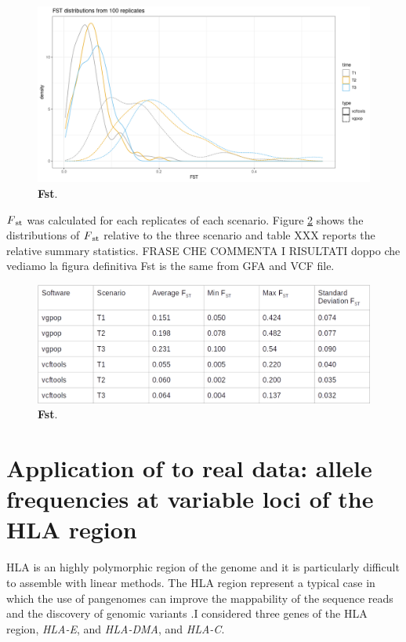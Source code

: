 \begin{figure}[H]
\centering
\includegraphics[width=1.00\textwidth]{fig/Fstvcftoolsandvgpop.png}
\decoRule
\caption{\textbf{Fst}.}
\label{fig:fsttime.png}
\end{figure}


$F\textsubscript{st}$ was calculated for each replicates of each scenario. Figure \ref{fig:fsttime.png} shows the distributions of $F\textsubscript{st}$ relative to the three scenario and table XXX reports the relative summary statistics. FRASE CHE COMMENTA I RISULTATI doppo che vediamo la figura definitiva    Fst is the same from GFA and VCF file.\\
 
\begin{figure}[H]
\centering
\includegraphics[width=1.00\textwidth]{fig/tabvcftoolsvgpop.png}
\decoRule
\caption{\textbf{Fst}.}
\label{fig:fsttime.png}
\end{figure}






\newpage
\section{Application of \vgp to real data: allele frequencies at variable loci of the HLA region}

HLA is an highly polymorphic region of the genome and it is particularly difficult to assemble with linear methods. The HLA region represent a typical case in which the use of pangenomes can improve the mappability of the sequence reads and the discovery of genomic variants \cite{chin2019diploid}.I considered three genes of the HLA region, \textit{HLA-E}, and \textit{HLA-DMA}, and \textit{HLA-C}.\\

